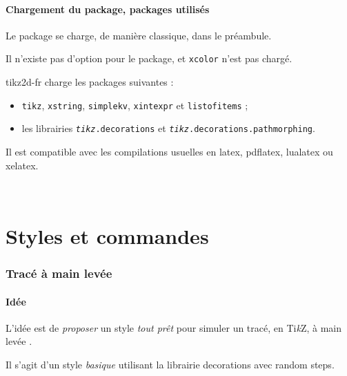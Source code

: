\documentclass[french,a4paper,11pt]{article}
\providecommand\tikzlogo{Ti\textit{k}Z}
\let\TikZ\tikzlogo
\begin{document}
\subsection{Chargement du package, packages utilisés}

\begin{importantblock}
Le package se charge, de manière classique, dans le préambule.

Il n'existe pas d'option pour le package, et \texttt{xcolor} n'est pas chargé.
\end{importantblock}


\begin{noteblock}
\textsf{tikz2d-fr} charge les packages suivantes :

\begin{itemize}
	\item \texttt{tikz}, \texttt{xstring}, \texttt{simplekv}, \texttt{xintexpr} et \texttt{listofitems} ;
	\item les librairies \texttt{\textit{tikz}.decorations} et \texttt{\textit{tikz}.decorations.pathmorphing}.
\end{itemize}

Il est compatible avec les compilations usuelles en \textsf{latex}, \textsf{pdflatex}, \textsf{lualatex} ou \textsf{xelatex}.
\end{noteblock}

\vfill~

\pagebreak

\part{Styles et commandes}

\section{Tracé à main levée}

\subsection{Idée}

\begin{tipblock}
L'idée est de \textit{proposer} un style \textit{tout prêt} pour simuler un tracé, en \TikZ, à \og main levée \fg.

Il s'agit d'un style \textit{basique} utilisant la librairie \textsf{decorations} avec \textsf{random steps}.
\end{tipblock}
\end{document}
